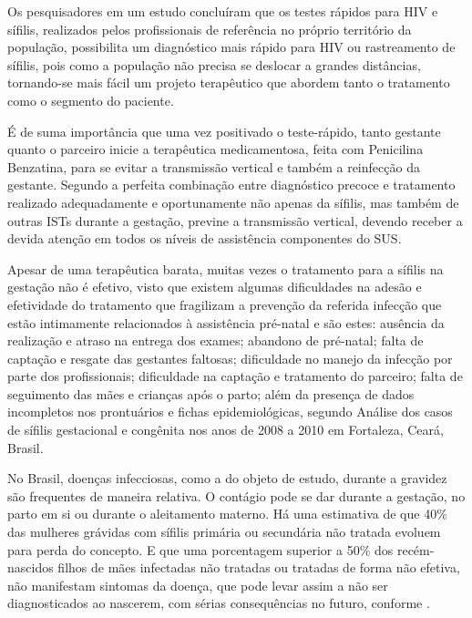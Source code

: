 Os pesquisadores \cite{bagatini2016teste} em um estudo concluíram que os testes rápidos para HIV e sífilis, realizados pelos profissionais de referência no próprio território da população, possibilita um diagnóstico mais rápido para HIV ou rastreamento de sífilis, pois como a população não precisa se deslocar a grandes distâncias, tornando-se mais fácil um projeto terapêutico que abordem tanto o tratamento como o segmento do paciente.

É de suma importância que uma vez positivado o teste-rápido, tanto gestante quanto o parceiro inicie a terapêutica medicamentosa, feita com Penicilina Benzatina, para se evitar a transmissão vertical e também a reinfecção da gestante. Segundo \cite{brasil2015protocolo} a perfeita combinação entre diagnóstico precoce e tratamento realizado adequadamente e oportunamente não apenas da sífilis, mas também de outras ISTs durante a gestação, previne a transmissão vertical, devendo receber a devida atenção em todos os níveis de assistência componentes do SUS.

Apesar de uma terapêutica barata, muitas vezes o tratamento para a sífilis na gestação não é efetivo, visto que existem algumas dificuldades na adesão e efetividade do tratamento que fragilizam a prevenção da referida infecção que estão intimamente relacionados à assistência pré-natal e são estes: ausência da realização e atraso na entrega dos exames; abandono de pré-natal; falta de captação e resgate das gestantes faltosas; dificuldade no manejo da infecção por parte dos profissionais; dificuldade na captação e tratamento do parceiro; falta de seguimento das mães e crianças após o parto; além da presença de dados incompletos nos prontuários e fichas epidemiológicas, segundo \cite{cardoso2018analise} Análise dos casos de sífilis gestacional e congênita nos anos de 2008 a 2010 em Fortaleza, Ceará, Brasil.

No Brasil, doenças infecciosas, como a do objeto de estudo, durante a gravidez são frequentes de maneira relativa. O contágio pode se dar durante a gestação, no parto em si ou durante o aleitamento materno. Há uma estimativa de que 40\% das mulheres grávidas com sífilis primária ou secundária não tratada evoluem para perda do concepto. E que uma porcentagem superior a 50\% dos recém-nascidos filhos de mães infectadas não tratadas ou tratadas de forma não efetiva, não manifestam sintomas da doença, que pode levar assim a não ser diagnosticados ao nascerem, com sérias consequências no futuro, conforme \cite{rodrigues2016elementos}.

